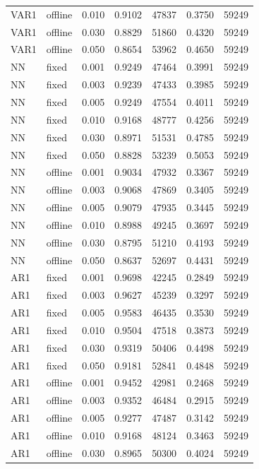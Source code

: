 \documentclass{article}
\begin{document}
\begin{longtable}[htbp]{l|l|l|*{4}{c}}
    VAR1 & offline & 0.010 & 0.9102 & 47837 & 0.3750 & 59249\\
    VAR1 & offline & 0.030 & 0.8829 & 51860 & 0.4320 & 59249\\
    VAR1 & offline & 0.050 & 0.8654 & 53962 & 0.4650 & 59249\\
    NN & fixed & 0.001 & 0.9249 & 47464 & 0.3991 & 59249\\
    NN & fixed & 0.003 & 0.9239 & 47433 & 0.3985 & 59249\\
    NN & fixed & 0.005 & 0.9249 & 47554 & 0.4011 & 59249\\
    NN & fixed & 0.010 & 0.9168 & 48777 & 0.4256 & 59249\\
    NN & fixed & 0.030 & 0.8971 & 51531 & 0.4785 & 59249\\
    NN & fixed & 0.050 & 0.8828 & 53239 & 0.5053 & 59249\\
    NN & offline & 0.001 & 0.9034 & 47932 & 0.3367 & 59249\\
    NN & offline & 0.003 & 0.9068 & 47869 & 0.3405 & 59249\\
    NN & offline & 0.005 & 0.9079 & 47935 & 0.3445 & 59249\\
    NN & offline & 0.010 & 0.8988 & 49245 & 0.3697 & 59249\\
    NN & offline & 0.030 & 0.8795 & 51210 & 0.4193 & 59249\\
    NN & offline & 0.050 & 0.8637 & 52697 & 0.4431 & 59249\\
    AR1 & fixed & 0.001 & 0.9698 & 42245 & 0.2849 & 59249\\
    AR1 & fixed & 0.003 & 0.9627 & 45239 & 0.3297 & 59249\\
    AR1 & fixed & 0.005 & 0.9583 & 46435 & 0.3530 & 59249\\
    AR1 & fixed & 0.010 & 0.9504 & 47518 & 0.3873 & 59249\\
    AR1 & fixed & 0.030 & 0.9319 & 50406 & 0.4498 & 59249\\
    AR1 & fixed & 0.050 & 0.9181 & 52841 & 0.4848 & 59249\\
    AR1 & offline & 0.001 & 0.9452 & 42981 & 0.2468 & 59249\\
    AR1 & offline & 0.003 & 0.9352 & 46484 & 0.2915 & 59249\\
    AR1 & offline & 0.005 & 0.9277 & 47487 & 0.3142 & 59249\\
    AR1 & offline & 0.010 & 0.9168 & 48124 & 0.3463 & 59249\\
    AR1 & offline & 0.030 & 0.8965 & 50300 & 0.4024 & 59249\\

\end{longtable}
\end{document}
